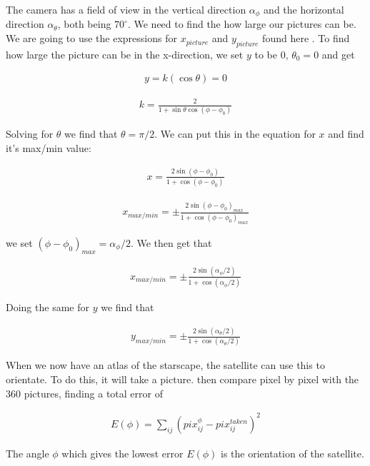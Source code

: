 \documentclass[a4paper, 10pt]{article}
\begin{document}
The camera has a field of view in the vertical direction $\alpha_{\phi}$ and the horizontal direction $\alpha_{\theta}$, both being $70^\circ$. We need to find the how large our pictures can be. We are going to use the expressions for $x_{picture}$ and $y_{picture}$ found here \cite{part4}. To find how large the picture can be in the x-direction, we set $y$ to be $0$, $\theta_0 = 0$ and get

\begin{align}
y = k(\cos \theta ) = 0
\end{align}

\begin{align}
k = \frac{2}{1+\sin \theta \cos (\phi - \phi_0)}
\end{align}

Solving for $\theta$ we find that $\theta = \pi/2$. We can put this in the equation for $x$ and find it's max/min value:

\begin{align}
x = \frac{2 \sin(\phi - \phi_0)}{1+\cos (\phi - \phi_0)}
\end{align}

\begin{align}
x_{max/min} = \pm \frac{2 \sin(\phi - \phi_0)_{max}}{1+\cos (\phi - \phi_0)_{max}}
\end{align}

we set $(\phi - \phi_0)_{max} = \alpha_{\phi}/2$. We then get that

\begin{align}
x_{max/min} = \pm \frac{2 \sin(\alpha_{\phi}/2)}{1+\cos (\alpha_{\phi}/2)}
\end{align}

Doing the same for $y$ we find that 

\begin{align}
y_{max/min} = \pm \frac{2 \sin(\alpha_{\theta}/2)}{1+\cos (\alpha_{\theta}/2)}
\end{align}


When we now have an atlas of the starscape, the satellite can use this to orientate. To do this, it will take a picture. then compare pixel by pixel with the 360 pictures, finding a total error of
 
\begin{align}
E(\phi) = \sum_{ij}(pix_{ij}^{\phi} - pix_{ij}^{taken})^2
\end{align}

The angle $\phi$ which gives the lowest error $E(\phi)$ is the orientation of the satellite.
\end{document}
